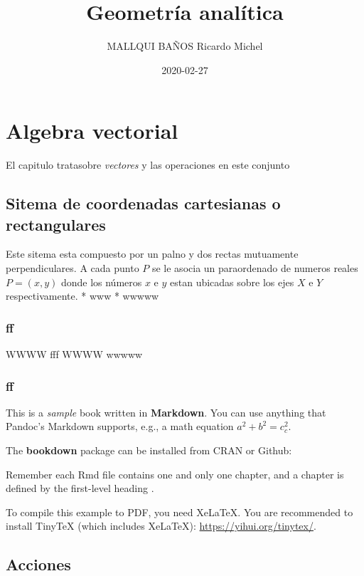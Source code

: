 \documentclass[12pt,]{report}
\title{Geometría analítica}
\author{MALLQUI BAÑOS Ricardo Michel}
\date{2020-02-27}
\theoremstyle{slplain}
\begin{document}
\maketitle

{
\setcounter{tocdepth}{1}
\tableofcontents
}
\hypertarget{algebra-vectorial}{%
\chapter{Algebra vectorial}\label{algebra-vectorial}}

El capitulo tratasobre \emph{vectores} y las operaciones en este conjunto

\hypertarget{sitema-de-coordenadas-cartesianas-o-rectangulares}{%
\section{Sitema de coordenadas cartesianas o rectangulares}\label{sitema-de-coordenadas-cartesianas-o-rectangulares}}

Este sitema esta compuesto por un palno y dos rectas mutuamente perpendiculares. A cada punto \(P\) se le asocia un paraordenado de numeros reales \(P=(x,y)\) donde los números \(x\) e \(y\) estan ubicadas sobre los ejes \(X\) e \(Y\) respectivamente.
* www
* wwwww

\hypertarget{ff}{%
\subsection{ff}\label{ff}}

WWWW fff
WWWW wwwww

\hypertarget{ff-1}{%
\subsection{ff}\label{ff-1}}

This is a \emph{sample} book written in \textbf{Markdown}. You can use anything that Pandoc's Markdown supports, e.g., a math equation \(a^2 + b^2 = c^2_c\).

The \textbf{bookdown} package can be installed from CRAN or Github:

Remember each Rmd file contains one and only one chapter, and a chapter is defined by the first-level heading .

To compile this example to PDF, you need XeLaTeX. You are recommended to install TinyTeX (which includes XeLaTeX): \url{https://yihui.org/tinytex/}.

\hypertarget{acciones}{%
\section{Acciones}\label{acciones}}
\end{document}
